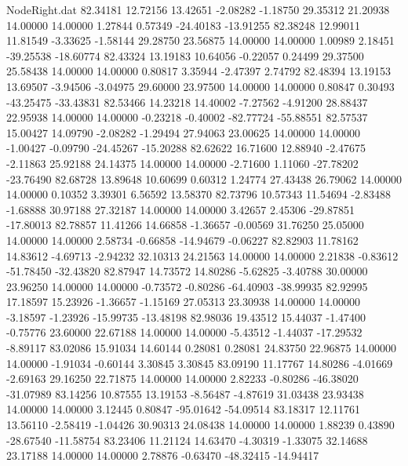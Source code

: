 \begin{filecontents}{NodeRight.dat}
  82.34181   12.72156   13.42651    -2.08282   -1.18750   29.35312   21.20938   14.00000   14.00000    1.27844    0.57349  -24.40183  -13.91255
  82.38248   12.99011   11.81549    -3.33625   -1.58144   29.28750   23.56875   14.00000   14.00000    1.00989    2.18451  -39.25538  -18.60774
  82.43324   13.19183   10.64056    -0.22057    0.24499   29.37500   25.58438   14.00000   14.00000    0.80817    3.35944   -2.47397    2.74792
  82.48394   13.19153   13.69507    -3.94506   -3.04975   29.60000   23.97500   14.00000   14.00000    0.80847    0.30493  -43.25475  -33.43831
  82.53466   14.23218   14.40002    -7.27562   -4.91200   28.88437   22.95938   14.00000   14.00000   -0.23218   -0.40002  -82.77724  -55.88551
  82.57537   15.00427   14.09790    -2.08282   -1.29494   27.94063   23.00625   14.00000   14.00000   -1.00427   -0.09790  -24.45267  -15.20288
  82.62622   16.71600   12.88940    -2.47675   -2.11863   25.92188   24.14375   14.00000   14.00000   -2.71600    1.11060  -27.78202  -23.76490
  82.68728   13.89648   10.60699     0.60312    1.24774   27.43438   26.79062   14.00000   14.00000    0.10352    3.39301    6.56592   13.58370
  82.73796   10.57343   11.54694    -2.83488   -1.68888   30.97188   27.32187   14.00000   14.00000    3.42657    2.45306  -29.87851  -17.80013
  82.78857   11.41266   14.66858    -1.36657   -0.00569   31.76250   25.05000   14.00000   14.00000    2.58734   -0.66858  -14.94679   -0.06227
  82.82903   11.78162   14.83612    -4.69713   -2.94232   32.10313   24.21563   14.00000   14.00000    2.21838   -0.83612  -51.78450  -32.43820
  82.87947   14.73572   14.80286    -5.62825   -3.40788   30.00000   23.96250   14.00000   14.00000   -0.73572   -0.80286  -64.40903  -38.99935
  82.92995   17.18597   15.23926    -1.36657   -1.15169   27.05313   23.30938   14.00000   14.00000   -3.18597   -1.23926  -15.99735  -13.48198
  82.98036   19.43512   15.44037    -1.47400   -0.75776   23.60000   22.67188   14.00000   14.00000   -5.43512   -1.44037  -17.29532   -8.89117
  83.02086   15.91034   14.60144     0.28081    0.28081   24.83750   22.96875   14.00000   14.00000   -1.91034   -0.60144    3.30845    3.30845
  83.09190   11.17767   14.80286    -4.01669   -2.69163   29.16250   22.71875   14.00000   14.00000    2.82233   -0.80286  -46.38020  -31.07989
  83.14256   10.87555   13.19153    -8.56487   -4.87619   31.03438   23.93438   14.00000   14.00000    3.12445    0.80847  -95.01642  -54.09514
  83.18317   12.11761   13.56110    -2.58419   -1.04426   30.90313   24.08438   14.00000   14.00000    1.88239    0.43890  -28.67540  -11.58754
  83.23406   11.21124   14.63470    -4.30319   -1.33075   32.14688   23.17188   14.00000   14.00000    2.78876   -0.63470  -48.32415  -14.94417

\end{filecontents}
